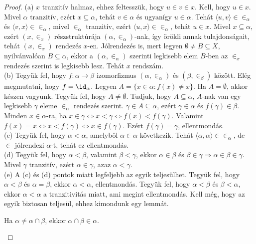 \begin{proof} (a) $x$ tranzitív halmaz, ehhez feltesszük, hogy $u \in v \in x$. Kell, hogy $u \in x$. Mivel $\alpha$ tranzitív, ezért $x \subseteq \alpha$, tehát $v \in \alpha$ és ugyanígy $u \in \alpha$. Tehát $\langle u, v \rangle \in \in_\alpha$ és $\langle v, x \rangle \in \in_\alpha$, mivel $\in_\alpha$ tranzitív, ezért $\langle u, x \rangle \in \in_\alpha$, tehát $u \in x$. Mivel $x \subseteq \alpha$, ezért $(x, \in_x)$ részstruktúrája $(\alpha, \in_\alpha)$-nak, így örökli annak tulajdonságait, tehát $(x,\in_x)$ rendezés $x$-en. Jólrendezés is, mert legyen $\emptyset \neq B \subseteq X$, nyilvánvalóan $B \subseteq \alpha$, ekkor a $(\alpha, \in_\alpha)$ szerinti legkisebb elem $B$-ben az $\in_x$ rendezés szerint is legkisebb lesz. Tehát $x$ rendszám. \\
(b) Tegyük fel, hogy $f : \alpha \rightarrow \beta$ izomorfizmus $(\alpha, \in_\alpha)$ és $(\beta, \in_\beta)$ között. Elég megmutatni, hogy $f = \id_\alpha$. Legyen $A = \lbrace x \in \alpha : f(x)\neq x \rbrace$. Ha $A = \emptyset$, akkor készen vagyunk. Tegyük fel, hogy $A \neq \emptyset$. Tudjuk, hogy $A \subseteq \alpha$, $A$-nak van egy legkisebb $\gamma$ eleme $\in_\alpha$ rendezés szerint. $\gamma \in A \subseteq \alpha$, ezért $\gamma \in \alpha$ és $f(\gamma) \in \beta$. Minden $x \in \alpha$-ra, ha $x \in \gamma \Leftrightarrow x < \gamma \Leftrightarrow f(x) < f(\gamma)$. Valamint $f(x) = x \Leftrightarrow x < f(\gamma) \Leftrightarrow x \in f(\gamma)$. Ezért $f(\gamma) = \gamma$, ellentmondás. \\
(c) Tegyük fel, hogy $\alpha < \alpha$, amelyből $\alpha \in \alpha$ következik. Tehát $\langle \alpha, \alpha \rangle \in \in_\alpha$, de $\in$ jólrendezi $\alpha$-t, tehát ez ellentmondás. \\
(d) Tegyük fel, hogy $\alpha < \beta$, valamint $\beta < \gamma$, ekkor $\alpha \in \beta$ és $\beta \in \gamma \Rightarrow \alpha \in \beta \in \gamma$. Mivel $\gamma$ tranzitív, ezért $\alpha \in \gamma$, azaz $\alpha < \gamma$. \\
(e) A (c) és (d) pontok miatt legfeljebb az egyik teljesülhet. Tegyük fel, hogy $\alpha < \beta$ és $\alpha = \beta$, ekkor $\alpha < \alpha$, ellentmondás. Tegyük fel, hogy $\alpha < \beta$ és $\beta < \alpha$, ekkor $\alpha < \alpha$ a tranzitivitás miatt, ami megint ellentmondás.
Kell még, hogy az egyik biztosan teljesül, ehhez kimondunk egy lemmát.
\begin{lem} Ha $\alpha \neq \alpha \cap \beta$, ekkor $\alpha \cap \beta \in \alpha$.

\end{lem}
\end{proof}
